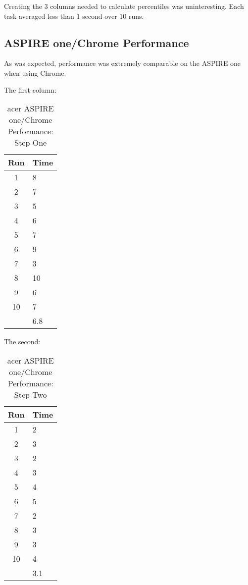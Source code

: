 Creating the 3 columns needed to calculate percentiles was uninteresting.  Each
task averaged less than 1 second over 10 runs.

\subsection{ASPIRE one/Chrome Performance}

As was expected, performance was extremely comparable on the ASPIRE one when
using Chrome.

The first column:

\begin{table}
  \begin{tabular}{| c | l |}
    \hline
    Run  & Time \\ \hline
    1    & 8    \\ \hline
    2    & 7    \\ \hline
    3    & 5    \\ \hline
    4    & 6    \\ \hline
    5    & 7    \\ \hline
    6    & 9    \\ \hline
    7    & 3    \\ \hline
    8    & 10   \\ \hline
    9    & 6    \\ \hline
    10   & 7    \\ \hline
    & 6.8  \\
    \hline
  \end{tabular}
  \caption{acer ASPIRE one/Chrome Performance: Step One}
  \label{aspChrPerf01}
\end{table}

The second:

\begin{table}
  \begin{tabular}{| c | l |}
    \hline
    Run  & Time \\ \hline
    1    & 2    \\ \hline
    2    & 3    \\ \hline
    3    & 2    \\ \hline
    4    & 3    \\ \hline
    5    & 4    \\ \hline
    6    & 5    \\ \hline
    7    & 2    \\ \hline
    8    & 3    \\ \hline
    9    & 3    \\ \hline
    10   & 4    \\ \hline
    & 3.1  \\
    \hline
  \end{tabular}
  \caption{acer ASPIRE one/Chrome Performance: Step Two}
  \label{aspChrPerf02}
\end{table}

